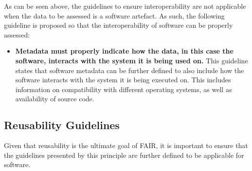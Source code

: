 \documentclass{cisfyp}
\begin{document}
As can be seen above, the guidelines to ensure interoperability are not applicable when the data to be assessed is a software artefact. As such, the following guideline is proposed so that the interoperability of software can be properly assessed:
\begin{itemize}
	\item \textbf{Metadata must properly indicate how the data, in this case the software, interacts with the system it is being used on.}\newline
	This guideline states that software metadata can be further defined to also include how the software interacts with the system it is being executed on. This includes information on compatibility with different operating systems, as well as availability of source code.
\end{itemize}\pagebreak
\subsection{Reusability Guidelines}
Given that reusability is the ultimate goal of FAIR, it is important to ensure that the guidelines presented by this principle are further defined to be applicable for software.
\end{document}
